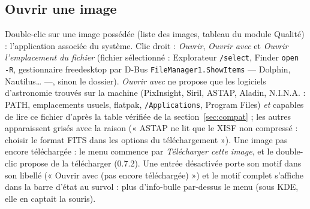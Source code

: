 \subsection{Ouvrir une image}\label{sec:ouvrir}
Double-clic sur une image possédée (liste des images, tableau du module Qualité) : l'application associée du
système. Clic droit : \emph{Ouvrir}, \emph{Ouvrir avec} et \emph{Ouvrir l'emplacement du fichier} (fichier
sélectionné : Explorateur \texttt{/select}, Finder \texttt{open -R}, gestionnaire freedesktop par D-Bus
\texttt{FileManager1.ShowItems} — Dolphin, Nautilus… —, sinon le dossier). \emph{Ouvrir avec} ne propose que les
logiciels d'astronomie trouvés sur la machine (PixInsight, Siril, ASTAP, Aladin, N.I.N.A. : PATH, emplacements
usuels, flatpak, \texttt{/Applications}, Program Files) \emph{et} capables de lire ce fichier d'après la table
vérifiée de la section~\ref{sec:compat} ; les autres apparaissent grisés avec la raison (« ASTAP ne lit que le XISF
non compressé : choisir le format FITS dans les options du téléchargement »). Une image pas encore téléchargée : le menu commence par
\emph{Télécharger cette image}, et le double-clic propose de la télécharger (0.7.2). Une entrée désactivée porte
son motif dans son libellé (« Ouvrir avec (pas encore téléchargée) ») et le motif
complet s'affiche dans la barre d'état au survol : plus d'info-bulle par-dessus le menu (sous KDE, elle en captait
la souris).

